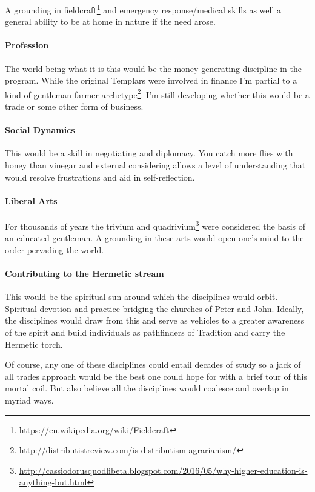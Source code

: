 A grounding in fieldcraft\footnote{\url{https://en.wikipedia.org/wiki/Fieldcraft}} and emergency response/medical skills as well a general ability to be at home in nature if the need arose.

\paragraph{Profession}


The world being what it is this would be the money generating discipline in the program. While the original Templars were involved in finance I'm partial to a kind of gentleman farmer archetype\footnote{\url{http://distributistreview.com/is-distributism-agrarianism/}}. I'm still developing whether this would be a trade or some other form of business.

\paragraph{Social Dynamics}


This would be a skill in negotiating and diplomacy. You catch more flies with honey than vinegar and external considering allows a level of understanding that would resolve frustrations and aid in self-reflection.

\paragraph{Liberal Arts}


For thousands of years the trivium and quadrivium\footnote{\url{http://cassiodorusquodlibeta.blogspot.com/2016/05/why-higher-education-is-anything-but.html}} were considered the basis of an educated gentleman. A grounding in these arts would open one's mind to the order pervading the world.

\paragraph{Contributing to the Hermetic stream}


This would be the spiritual sun around which the disciplines would orbit. Spiritual devotion and practice bridging the churches of Peter and John. Ideally, the disciplines would draw from this and serve as vehicles to a greater awareness of the spirit and build individuals as pathfinders of Tradition and carry the Hermetic torch.

Of course, any one of these disciplines could entail decades of study so a jack of all trades approach would be the best one could hope for with a brief tour of this mortal coil. But also believe all the disciplines would coalesce and overlap in myriad ways.

